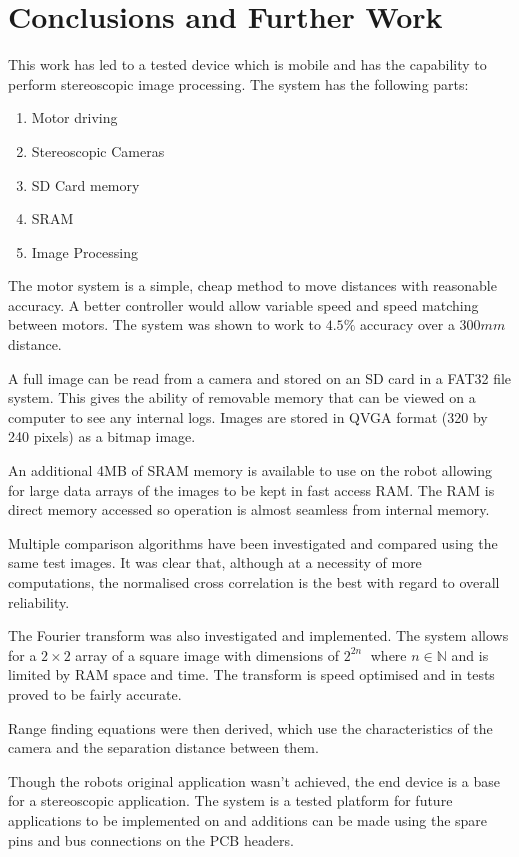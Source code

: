 \chapter{Conclusions and Further Work} \label{Chapter: Conclusions}

This work has led to a tested device which is mobile and has the capability to perform stereoscopic image processing. The system has the following parts:

\begin{enumerate}
\item Motor driving
\item Stereoscopic Cameras
\item SD Card memory
\item SRAM
\item Image Processing
\end{enumerate} 

The motor system is a simple, cheap method to move distances with reasonable accuracy. A better controller would allow variable speed and speed matching between motors. The system was shown to work to $4.5\%$ accuracy over a $300mm$ distance.

A full image can be read from a camera and stored on an SD card in a FAT32 file system. This gives the ability of removable memory that can be viewed on a computer to see any internal logs. Images are stored in QVGA format (320 by 240 pixels) as a bitmap image. 

An additional 4MB of SRAM memory is available to use on the robot allowing for large data arrays of the images to be kept in fast access RAM. The RAM is direct memory accessed so operation is almost seamless from internal memory.

Multiple comparison algorithms have been investigated and compared using the same test images. It was clear that, although at a necessity of more computations, the normalised cross correlation is the best with regard to overall reliability. 

The Fourier transform was also investigated and implemented. The system allows for a $2 \times 2$ array of a square image with dimensions of $2^{2n}\; $ where $n \in \mathbb{N}$ and is limited by RAM space and time. The transform is speed optimised and in tests proved to be fairly accurate. 

Range finding equations were then derived, which use the characteristics of the camera and the separation distance between them. 



Though the robots original application wasn't achieved, the end device is a base for a stereoscopic application. The system is a tested platform for future applications to be implemented on and additions can be made using the spare pins and bus connections on the PCB headers. 
